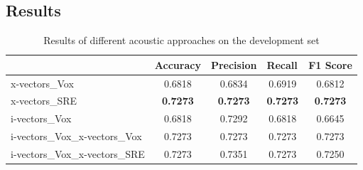 \subsection{Results}
\begin{table}[h]
  \begin{center}
  \begin{tabular}{lcccc}
  \hline
  & \multicolumn{1}{l}{\textbf{Accuracy}} & \multicolumn{1}{l}{\textbf{Precision}} & \multicolumn{1}{l}{\textbf{Recall}} & \multicolumn{1}{l}{\textbf{F1 Score}} \\
  \hline
  x-vectors\_Vox           & 0.6818                               & 0.6834                                & 0.6919                             & 0.6812                               \\
  x-vectors\_SRE              & \textbf{0.7273}                               & \textbf{0.7273}                                & \textbf{0.7273}                             & \textbf{0.7273}                               \\
  i-vectors\_Vox          & 0.6818                               & 0.7292                                & 0.6818                             & 0.6645                               \\
  i-vectors\_Vox\_x-vectors\_Vox & 0.7273                               & 0.7273                                & 0.7273                             & 0.7273                               \\
  i-vectors\_Vox\_x-vectors\_SRE      & 0.7273                               & 0.7351                                & 0.7273                             & 0.7250                                \\
  \hline
  \end{tabular}
  \caption{Results of different acoustic approaches on the development set}
  \label{tab:adress_acoustics}    
\end{center}
\end{table}

